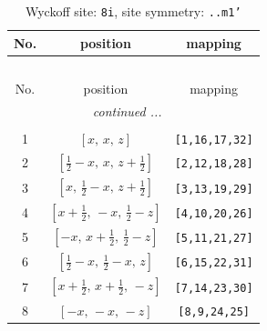 \documentclass[fleqn,8pt]{jsarticle}
\begin{document}
\begin{longtable}{ccc}
\caption{Wyckoff site: {\tt 8i}, site symmetry: {\tt ..m1'}}
 \\
 \hline \hline
No. & position & mapping \\ \hline \endfirsthead

\multicolumn{2}{l}{\tablename\ \thetable{}} \\
 \hline \hline
No. & position & mapping \\ \hline \endhead

 \hline \hline
\multicolumn{2}{r}{\footnotesize\it continued ...} \\ \endfoot

 \hline \hline
\multicolumn{2}{r}{} \\ \endlastfoot

1 & $\left[ x,\, x,\, z \right]$ & {\tt [1,16,17,32]} \\ \hline
2 & $\left[ \frac{1}{2} - x,\, x,\, z + \frac{1}{2} \right]$ & {\tt [2,12,18,28]} \\ \hline
3 & $\left[ x,\, \frac{1}{2} - x,\, z + \frac{1}{2} \right]$ & {\tt [3,13,19,29]} \\ \hline
4 & $\left[ x + \frac{1}{2},\, - x,\, \frac{1}{2} - z \right]$ & {\tt [4,10,20,26]} \\ \hline
5 & $\left[ - x,\, x + \frac{1}{2},\, \frac{1}{2} - z \right]$ & {\tt [5,11,21,27]} \\ \hline
6 & $\left[ \frac{1}{2} - x,\, \frac{1}{2} - x,\, z \right]$ & {\tt [6,15,22,31]} \\ \hline
7 & $\left[ x + \frac{1}{2},\, x + \frac{1}{2},\, - z \right]$ & {\tt [7,14,23,30]} \\ \hline
8 & $\left[ - x,\, - x,\, - z \right]$ & {\tt [8,9,24,25]} \\
\end{longtable}
\renewcommand{\arraystretch}{1.2}
\end{document}
